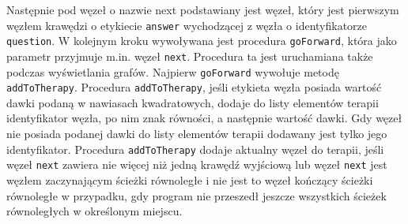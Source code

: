 Następnie pod węzeł o nazwie next podstawiany jest węzeł, który jest pierwszym węzłem krawędzi o etykiecie \texttt{answer} wychodzącej z węzła o identyfikatorze \texttt{question}. W kolejnym kroku wywoływana jest procedura \texttt{goForward}, która jako parametr przyjmuje m.in. węzeł \texttt{next}. 
Procedura ta jest uruchamiana także podczas wyświetlania grafów. Najpierw 
\texttt{goForward} wywołuje metodę \texttt{addToTherapy}. Procedura \texttt{addToTherapy}, jeśli etykieta węzła posiada wartość dawki podaną w nawiasach kwadratowych, dodaje do listy elementów terapii identyfikator węzła, po nim znak równości, a następnie wartość dawki. Gdy węzeł nie posiada podanej dawki do listy elementów terapii dodawany jest tylko jego identyfikator. 
Procedura \texttt{addToTherapy} dodaje aktualny węzeł do terapii, jeśli węzeł \texttt{next} zawiera nie więcej niż jedną krawędź wyjściową lub węzeł \texttt{next} jest węzłem zaczynającym ścieżki równoległe 
i nie jest to węzeł kończący ścieżki równoległe w przypadku, gdy program nie przeszedł jeszcze wszystkich ścieżek równoległych w określonym miejscu. 


